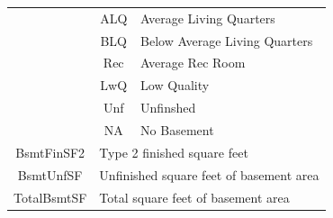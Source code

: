 \documentclass[11pt]{scrartcl} %
\begin{document}
\begin{center}
\begin{tabular}{c c c c c c}
\multicolumn{2}{|c}{} & \multicolumn{1}{c}{ALQ} & \multicolumn{3}{l|}{Average Living Quarters}\\
\multicolumn{2}{|c}{} & \multicolumn{1}{c}{BLQ} & \multicolumn{3}{l|}{Below Average Living Quarters}\\
\multicolumn{2}{|c}{} & \multicolumn{1}{c}{Rec} & \multicolumn{3}{l|}{Average Rec Room}\\
\multicolumn{2}{|c}{} & \multicolumn{1}{c}{LwQ} & \multicolumn{3}{l|}{Low Quality}\\
\multicolumn{2}{|c}{} & \multicolumn{1}{c}{Unf} & \multicolumn{3}{l|}{Unfinshed}\\
\multicolumn{2}{|c}{} & \multicolumn{1}{c}{NA} & \multicolumn{3}{l|}{No Basement}\\
\hline
\multicolumn{2}{|c}{BsmtFinSF2} & \multicolumn{4}{l|}{Type 2 finished square feet}\\
\hline
\multicolumn{2}{|c}{BsmtUnfSF} & \multicolumn{4}{l|}{Unfinished square feet of basement area}\\
\hline
\multicolumn{2}{|c}{TotalBsmtSF} & \multicolumn{4}{l|}{Total square feet of basement area}\\
\hline
\end{tabular}
\end{center}
\end{document}
